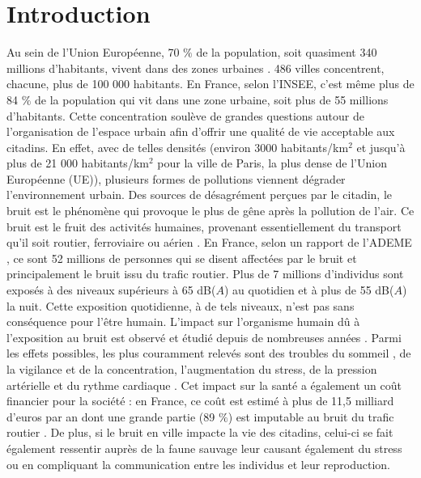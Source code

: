 
\chapter*{Introduction}
\label{chap:intro}


Au sein de l'Union Européenne, 70 $\%$ de la population, soit quasiment 340 millions d'habitants, vivent dans des zones urbaines \cite{europ-commission_data_2017}. 486 villes concentrent, chacune, plus de 100 000 habitants. En France, selon l'INSEE, c'est même plus de 84 $\%$ de la population qui vit dans une zone urbaine, soit plus de 55 millions d'habitants. Cette concentration soulève de grandes questions autour de l'organisation de l'espace urbain afin d'offrir une qualité de vie acceptable aux citadins. En effet, avec de telles densités (environ 3000 habitants/km$^2$ et jusqu'à plus de 21 000  habitants/km$^2$ pour la ville de Paris, la plus dense de l'Union Européenne (UE)), plusieurs formes de pollutions viennent dégrader l'environnement urbain. Des sources de désagrément perçues par le citadin, le bruit est le phénomène qui provoque le plus de gêne après la pollution de l'air. Ce bruit est le fruit des activités humaines, provenant essentiellement du transport qu'il soit routier, ferroviaire ou aérien \cite{zannin_characterization_2013}.
En France, selon un rapport de l'ADEME \cite{europeens2016analyse}, ce sont 52 millions de personnes qui se disent affectées par le bruit et principalement le bruit issu du trafic routier. Plus de 7 millions d'individus sont exposés à des niveaux supérieurs à 65 dB($A$) au quotidien et à plus de 55 dB($A$) la nuit.
Cette exposition quotidienne, à de tels niveaux, n'est pas sans conséquence pour l'être humain. L'impact sur l'organisme humain dû à l'exposition au bruit est observé et étudié depuis de nombreuses années \cite{ising1980health}. Parmi les effets possibles, les plus couramment relevés sont des troubles du sommeil \cite{pirrera2010nocturnal}, de la vigilance et de la concentration, l'augmentation du stress, de la pression artérielle et du rythme cardiaque \cite{babisch2005traffic, babisch2008road}. Cet impact sur la santé a également un coût financier pour la société : en France, ce coût est estimé à plus de 11,5 milliard d'euros par an dont une grande partie (89 $\%$) est imputable au bruit du trafic routier \cite{europeens2016analyse}. De plus, si le bruit en ville impacte la vie des citadins, celui-ci se fait également ressentir auprès de la faune sauvage \cite{dutilleux_anthropogenic_2012, francis2009noise} leur causant également du stress ou en compliquant la communication entre les individus et leur reproduction.\\

